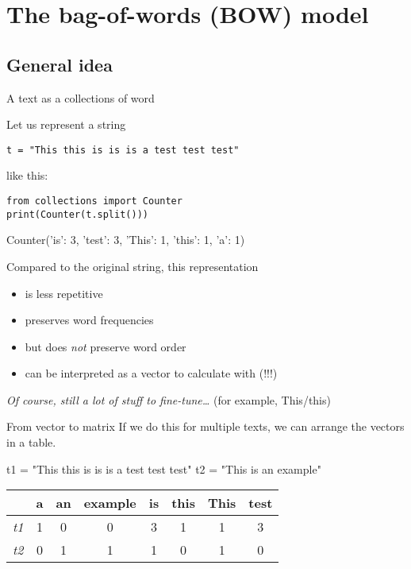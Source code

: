 \section[The BOW]{The bag-of-words (BOW) model}

\subsection{General idea}

\begin{frame}[fragile]{A text as a collections of word}

Let us represent a string 
\begin{lstlisting}
t = "This this is is is a test test test"
\end{lstlisting}
like this:\\
\begin{lstlisting}
from collections import Counter
print(Counter(t.split()))
\end{lstlisting}
\begin{lstlistingoutput}
Counter({'is': 3, 'test': 3, 'This': 1, 'this': 1, 'a': 1})
\end{lstlistingoutput}

\pause 
Compared to the original string, this representation
\begin{itemize}
	\item is less repetitive
	\item preserves word frequencies
	\item but does \emph{not} preserve word order
	\item can be interpreted as a vector to calculate with (!!!)
\end{itemize}

\tiny{\emph{Of course, still a lot of stuff to fine-tune\ldots}  (for example, This/this)}
\end{frame}



\begin{frame}{From vector to matrix}
If we do this for multiple texts, we can arrange the vectors in a table.

t1 = "This this is is is a test test test" \newline
t2 = "This is an example"

\begin{tabular}{| c|c|c|c|c|c|c|c|}
	\hline
	& a & an & example & is & this & This & test \\
	\hline
	\emph{t1} & 1 & 0 & 0 & 3 & 1 & 1 & 3 \\
	\emph{t2} &0 & 1 & 1 & 1 & 0 & 1 & 0 \\
	\hline
\end{tabular}
\end{frame}


